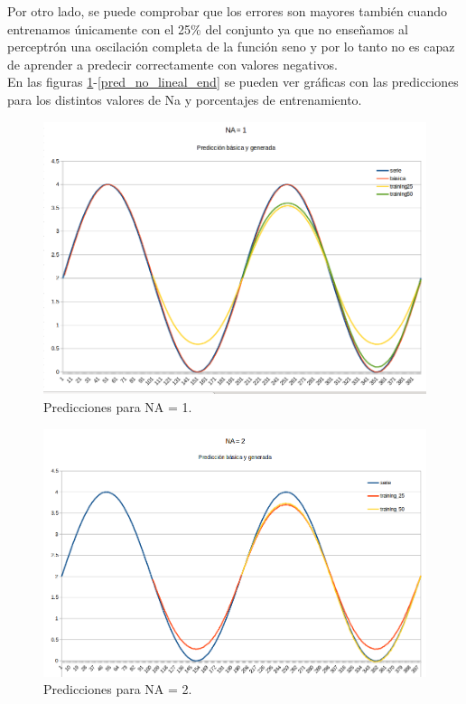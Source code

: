 \documentclass[spanish]{assignment}
\begin{document}
	Por otro lado, se puede comprobar que los errores son mayores también cuando entrenamos únicamente con el 25\% del conjunto ya que no enseñamos al perceptrón una oscilación completa de la función seno y por lo tanto no es capaz de aprender a predecir correctamente con valores negativos.\\
	
	En las figuras \ref{pred_no_lineal_ini}-\ref{pred_no_lineal_end} se pueden ver gráficas con las predicciones para los distintos valores de Na y porcentajes de entrenamiento.\\
	
	\begin{figure}[H]
		\centering
		\includegraphics[scale=0.25]{predNA1.png}		
		\caption{Predicciones para NA = 1.}				
		\label{pred_no_lineal_ini}
	\end{figure}
	\begin{figure}[H]
		\centering
		\includegraphics[scale=0.25]{predNA2.png}		
		\caption{Predicciones para NA = 2.}				
	\end{figure}
\end{document}
